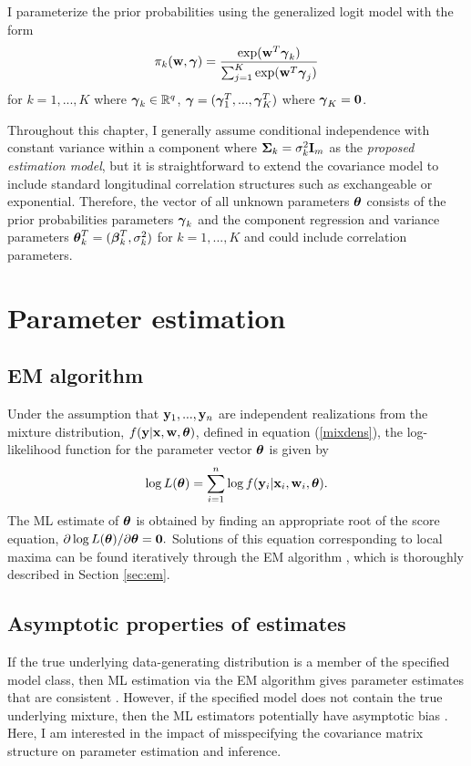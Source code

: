 I parameterize the prior probabilities using the generalized logit model with the form
$$\pi_{k}(\mathbf w,\boldsymbol\gamma)=\frac{\exp(\mathbf w^{T}\boldsymbol\gamma_{k})}{\sum_{j=1}^{K}\exp(\mathbf w^{T}\boldsymbol\gamma_{j})}$$ 
for $k=1,...,K$ where $\boldsymbol \gamma_{k}\in\mathbb{R}^{q}$, $\boldsymbol\gamma = (\boldsymbol\gamma_1^T,...,\boldsymbol\gamma_K^T)$ where $\boldsymbol\gamma_{K}=\mathbf 0$.

Throughout this chapter, I generally assume conditional independence with constant variance within a component where $\mathbf\Sigma_{k}=\sigma^{2}_{k}\mathbf I_{m}$ as the {\em proposed estimation model}, but it is straightforward to extend the covariance model to include standard longitudinal correlation structures such as exchangeable or exponential. Therefore, the vector of all unknown parameters $\boldsymbol\theta$ consists of the prior probabilities parameters $\boldsymbol\gamma_{k}$ and the component regression and variance parameters $\boldsymbol\theta^{T}_{k}=(\boldsymbol\beta^{T}_{k},\sigma^{2}_{k})$ for $k=1,...,K$ and could include correlation parameters.  

\section{Parameter estimation}\label{chp2:sec:est}
\subsection{EM algorithm}
Under the assumption that $\mathbf y_{1},...,\mathbf y_{n}$ are independent realizations from the mixture distribution, $f(\mathbf y | \mathbf x, \mathbf w, \boldsymbol\theta)$, defined in equation (\ref{mixdens}), the log-likelihood function for the parameter vector $\boldsymbol \theta$ is given by
$$\log L(\boldsymbol\theta)=\sum^{n}_{i=1}\log f(\mathbf y_{i}|\mathbf x_{i},\mathbf w_{i},\boldsymbol \theta).$$
The ML estimate of $\boldsymbol\theta$ is obtained by finding an appropriate root of the score equation, $\partial \log L(\boldsymbol\theta)/\partial \boldsymbol\theta=\mathbf 0.$
Solutions of this equation corresponding to local maxima can be found iteratively through the EM algorithm \cite{dempster1977}, which is thoroughly described in Section \ref{sec:em}. 

\subsection{Asymptotic properties of estimates}
If the true underlying data-generating distribution is a member of the specified model class, then ML estimation via the EM algorithm gives parameter estimates that are consistent  \cite{wald1949, lecam1953}. However, if the specified model does not contain the true underlying mixture, then the ML estimators potentially have asymptotic bias \cite{gray1994,lo2011}. Here, I am interested in the impact of misspecifying the covariance matrix structure on parameter estimation and inference.

